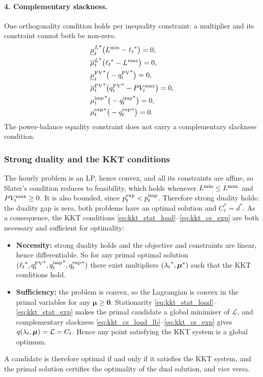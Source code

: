 \paragraph{4. Complementary slackness.}
One orthogonality condition holds per inequality constraint: a multiplier and its constraint
cannot both be non-zero.
\begin{align}
    & {\underline{\mu}^{L}_{t}}^* \big( L^{\min} - {\ell_{t}}^* \big) = 0, \label{eq:kkt_cs_load_lb} \\
    & {\overline{\mu}^{L}_{t}}^* \big( {\ell_{t}}^* - L^{\max} \big) = 0, \label{eq:kkt_cs_load_ub} \\
    & {\underline{\mu}^{\mathrm{PV}}_{t}}^* \big( -{q^{\mathrm{PV}}_{t}}^* \big) = 0, \label{eq:kkt_cs_pv_lb} \\
    & {\overline{\mu}^{\mathrm{PV}}_{t}}^* \big( {q^{\mathrm{PV}}_{t}}^* - PV_{t}^{\max} \big) = 0, \label{eq:kkt_cs_pv_ub} \\
    & {\mu^{\mathrm{imp}}_{t}}^* \big( -{q^{\mathrm{imp}}_{t}}^* \big) = 0, \label{eq:kkt_cs_imp} \\
    & {\mu^{\mathrm{exp}}_{t}}^* \big( -{q^{\mathrm{exp}}_{t}}^* \big) = 0. \label{eq:kkt_cs_exp}
\end{align}
The power-balance equality constraint does not carry a complementary slackness condition.

\subsubsection{Strong duality and the KKT conditions}
The hourly problem is an LP, hence convex, and all its constraints are affine, so Slater's
condition reduces to feasibility, which holds whenever $L^{\min} \leq L^{\max}$ and $PV_{t}^{\max} \geq 0$. It is also bounded, since $p^{\mathrm{exp}}_{t} < p^{\mathrm{imp}}_{t}$. Therefore strong duality holds: the duality gap is zero, both problems have an optimal solution and $C_t^* = d^*$. As a consequence, the KKT conditions \eqref{eq:kkt_stat_load}--\eqref{eq:kkt_cs_exp} are both necessary and sufficient for optimality:
\begin{itemize}
    \item \textbf{Necessity:} strong duality holds and the objective and constraints are
    linear, hence differentiable. So for any primal optimal solution
    $({\ell_{t}}^*, {q^{\mathrm{PV}}_{t}}^*, {q^{\mathrm{imp}}_{t}}^*, {q^{\mathrm{exp}}_{t}}^*)$ there exist multipliers
    $({\lambda_{t}}^*, \boldsymbol{\mu}^*)$ such that the KKT conditions hold.
    \item \textbf{Sufficiency:} the problem is convex, so the Lagrangian is convex in the
    primal variables for any $\boldsymbol{\mu} \geq \mathbf{0}$. Stationarity
    \eqref{eq:kkt_stat_load}--\eqref{eq:kkt_stat_exp} makes the primal candidate a global
    minimiser of $\mathcal{L}$, and complementary slackness
    \eqref{eq:kkt_cs_load_lb}--\eqref{eq:kkt_cs_exp} gives
    $q(\lambda_{t}, \boldsymbol{\mu}) = \mathcal{L} = C_t$. Hence any point satisfying the KKT
    system is a global optimum.
\end{itemize}
A candidate is therefore optimal if and only if it satisfies the KKT system, and the primal solution certifies the optimality of the dual solution, and vice versa.

